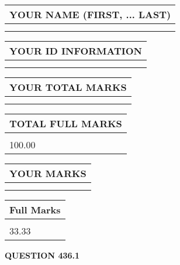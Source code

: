 \documentclass{ctexart}
\begin{document}
   
   
   
\newpage 
\setcounter{page}{ 
   436001 } 
   
   
   
   
\noindent\begin{tabular}{|l|}
\hline
YOUR NAME (FIRST, ... LAST)  \\
\hline
 \\ 
 \\ 
\hline
\end{tabular}
\hspace{0.05in} \begin{tabular}{|l|}
\hline
 YOUR   ID   INFORMATION  \\
\hline
 \\ 
 \\ 
\hline
\end{tabular}
   
   
\vspace{0.2in}\noindent\begin{tabular}{|l|}
\hline
YOUR TOTAL MARKS  \\
\hline
 \\ 
 \\ 
\hline
\end{tabular}
\hspace{0.05in} \begin{tabular}{|l|}
\hline
TOTAL FULL MARKS  \\
\hline
 \\ 
100.00 \\
\hline
\end{tabular}
   
   
 \vspace{0.2in}
 
 
 
 
   
   
  
\vspace{0.2in}
  
\noindent\begin{tabular}{|l|}
\hline
 YOUR MARKS  \\
\hline
 \\ 
 \\ 
\hline
\end{tabular}
\hspace{0.05in} \begin{tabular}{|l|}
\hline
 Full Marks  \\
\hline
 \\ 
33.33 \\
\hline
\end{tabular}
{\textbf{\Large{QUESTION
436.1 
}}}
  
\end{document}
